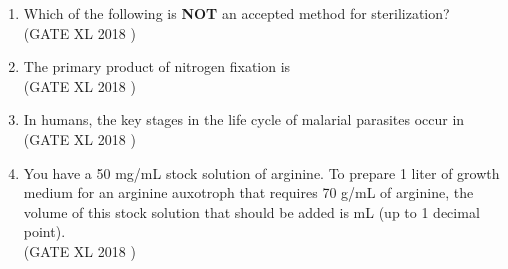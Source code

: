 \documentclass[14pt]{extarticle}
\begin{document}
\begin{flushleft}
\begin{enumerate}
\item Which of the following is \textbf{NOT} an accepted method for sterilization?\\
\hfill(GATE XL 2018 )\\
\begin{enumerate}
\end{enumerate}

\item The primary product of nitrogen fixation is\\
\hfill(GATE XL 2018 )\\
\begin{enumerate}
\end{enumerate}

\item In humans, the key stages in the life cycle of malarial parasites occur in\\
\hfill(GATE XL 2018 )\\
\begin{enumerate}
\end{enumerate}

\item You have a 50 mg/mL stock solution of arginine. To prepare 1 liter of growth medium for an arginine auxotroph that requires 70 \textmu g/mL of arginine, the volume of this stock solution that should be added is \underline{\hspace{4cm}} mL (up to 1 decimal point).\\
\hfill(GATE XL 2018 )\\


\end{enumerate}
\end{flushleft}
\end{document}
